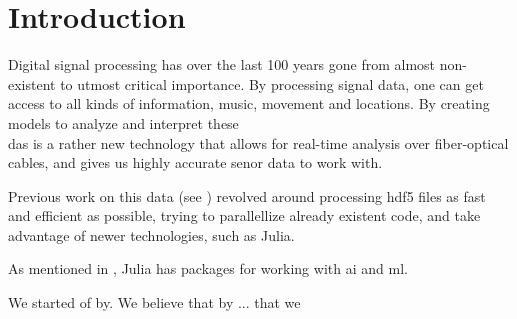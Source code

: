 \chapter{Introduction}
\label{chap:introduction}

Digital signal processing has over the last 100 years gone from almost non-existent to utmost critical importance. By processing signal data, one can get access to all kinds of information, music, movement and locations. By creating models to analyze and interpret these  \\

\acrfull{das} is a rather new technology that allows for real-time analysis over fiber-optical cables, and gives us highly accurate senor data to work with. 

Previous work on this data (see \cite{projthesis}) revolved around processing \acrshort{hdf5} files as fast and efficient as possible, trying to parallellize already existent code, and take advantage of newer technologies, such as Julia.

As mentioned in \cite{projthesis}, Julia has packages for working with \acrshort{ai} and \acrshort{ml}. 

We started of by. We believe that by ... that we 